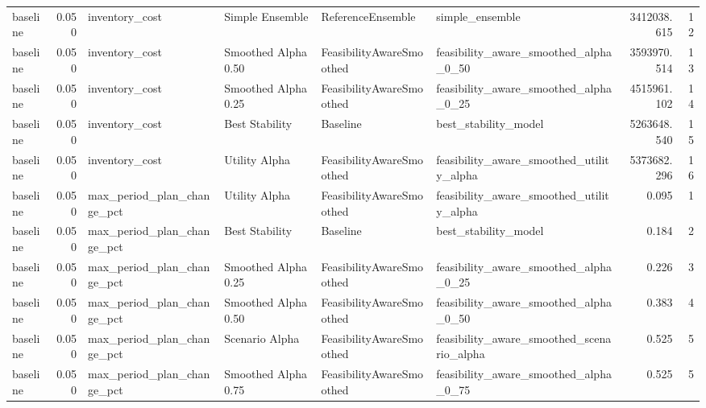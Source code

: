 \begin{table}
{\begin{tabular}{lrllllrr}
      baseline &             0.050 &              inventory\_cost &       Simple Ensemble &         ReferenceEnsemble &                                    simple\_ensemble &   3412038.615 &              12 \\
      baseline &             0.050 &              inventory\_cost &   Smoothed Alpha 0.50 &  FeasibilityAwareSmoothed &              feasibility\_aware\_smoothed\_alpha\_0\_50 &   3593970.514 &              13 \\
      baseline &             0.050 &              inventory\_cost &   Smoothed Alpha 0.25 &  FeasibilityAwareSmoothed &              feasibility\_aware\_smoothed\_alpha\_0\_25 &   4515961.102 &              14 \\
      baseline &             0.050 &              inventory\_cost &        Best Stability &                  Baseline &                               best\_stability\_model &   5263648.540 &              15 \\
      baseline &             0.050 &              inventory\_cost &         Utility Alpha &  FeasibilityAwareSmoothed &           feasibility\_aware\_smoothed\_utility\_alpha &   5373682.296 &              16 \\
      baseline &             0.050 &  max\_period\_plan\_change\_pct &         Utility Alpha &  FeasibilityAwareSmoothed &           feasibility\_aware\_smoothed\_utility\_alpha &         0.095 &               1 \\
      baseline &             0.050 &  max\_period\_plan\_change\_pct &        Best Stability &                  Baseline &                               best\_stability\_model &         0.184 &               2 \\
      baseline &             0.050 &  max\_period\_plan\_change\_pct &   Smoothed Alpha 0.25 &  FeasibilityAwareSmoothed &              feasibility\_aware\_smoothed\_alpha\_0\_25 &         0.226 &               3 \\
      baseline &             0.050 &  max\_period\_plan\_change\_pct &   Smoothed Alpha 0.50 &  FeasibilityAwareSmoothed &              feasibility\_aware\_smoothed\_alpha\_0\_50 &         0.383 &               4 \\
      baseline &             0.050 &  max\_period\_plan\_change\_pct &        Scenario Alpha &  FeasibilityAwareSmoothed &          feasibility\_aware\_smoothed\_scenario\_alpha &         0.525 &               5 \\
      baseline &             0.050 &  max\_period\_plan\_change\_pct &   Smoothed Alpha 0.75 &  FeasibilityAwareSmoothed &              feasibility\_aware\_smoothed\_alpha\_0\_75 &         0.525 &               5 \\

\end{tabular}}
\end{table}
